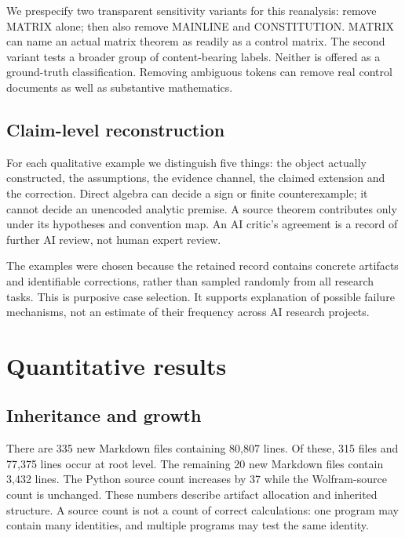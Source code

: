 \documentclass[11pt,a4paper]{article}
\begin{document}
We prespecify two transparent sensitivity variants for this reanalysis: remove
MATRIX alone; then also remove MAINLINE and CONSTITUTION. MATRIX can name an
actual matrix theorem as readily as a control matrix. The second variant
tests a broader group of content-bearing labels. Neither is offered as a
ground-truth classification. Removing ambiguous tokens can remove real control
documents as well as substantive mathematics.

\subsection{Claim-level reconstruction}
For each qualitative example we distinguish five things: the object actually
constructed, the assumptions, the evidence channel, the claimed extension and
the correction. Direct algebra can decide a sign or finite counterexample;
it cannot decide an unencoded analytic premise. A source theorem contributes
only under its hypotheses and convention map. An AI critic's agreement is a
record of further AI review, not human expert review.

The examples were chosen because the retained record contains concrete
artifacts and identifiable corrections, rather than sampled randomly from
all research tasks. This is purposive case selection. It supports explanation
of possible failure mechanisms, not an estimate of their frequency across AI
research projects.

\section{Quantitative results}
\subsection{Inheritance and growth}
There are 335 new Markdown files containing 80,807 lines. Of these, 315 files
and 77,375 lines occur at root level. The remaining 20 new Markdown files
contain 3,432 lines. The Python source count increases by 37 while the
Wolfram-source count is unchanged. These numbers describe artifact allocation
and inherited structure. A source count is not a count of correct calculations:
one program may contain many identities, and multiple programs may test the
same identity.
\end{document}
